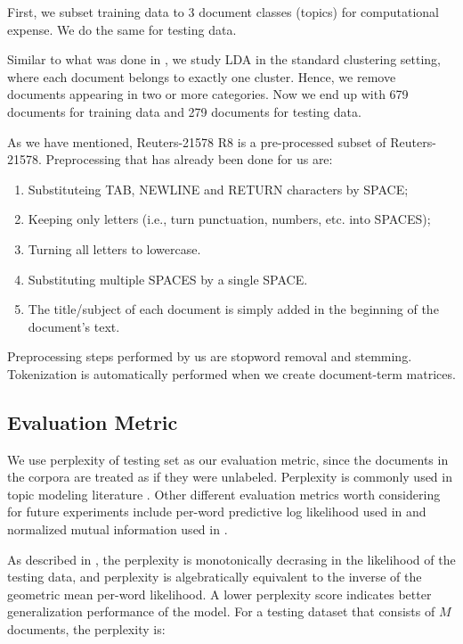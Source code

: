 \documentclass{article}
\begin{document}
First, we subset training data to 3 document classes (topics) for computational expense. We do the same for testing data.

Similar to what was done in \cite{lu2011investigating}, we study LDA in the standard clustering setting, where each document belongs to exactly one cluster. Hence, we remove documents appearing in two or more categories. Now we end up with 679 documents for training data and 279 documents for testing data.

As we have mentioned, Reuters-21578 R8 is a pre-processed subset of Reuters-21578. Preprocessing that has already been done for us are:

\begin{enumerate}
  \item Substituteing TAB, NEWLINE and RETURN characters by SPACE;
  \item Keeping only letters (i.e., turn punctuation, numbers, etc. into SPACES);
  \item Turning all letters to lowercase.
  \item Substituting multiple SPACES by a single SPACE.
  \item The title/subject of each document is simply added in the beginning of the document's text.
\end{enumerate}

Preprocessing steps performed by us are stopword removal and stemming. Tokenization is automatically performed when we create document-term matrices.


\subsection{Evaluation Metric}

We use perplexity of testing set as our evaluation metric, since the documents in the corpora are treated as if they were unlabeled. Perplexity is commonly used in topic modeling literature \cite{blei2003latent,blei2007correlated}. Other different evaluation metrics worth considering for future experiments include per-word predictive log likelihood used in \cite{wang2018general} and normalized mutual information used in \cite{lu2011investigating}.

As described in \cite{blei2003latent}, the perplexity is monotonically decrasing in the likelihood of the testing data, and perplexity is algebratically equivalent to the inverse of the geometric mean per-word likelihood. A lower perplexity score indicates better generalization performance of the model. For a testing dataset that consists of $M$ documents, the perplexity is:
\end{document}
